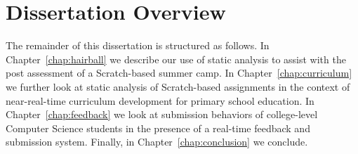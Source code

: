 \section{Dissertation Overview}
The remainder of this dissertation is structured as follows. In
Chapter~\ref{chap:hairball} we describe our use of static analysis to assist
with the post assessment of a Scratch-based summer camp. In
Chapter~\ref{chap:curriculum} we further look at static analysis of
Scratch-based assignments in the context of near-real-time curriculum
development for primary school education. In Chapter~\ref{chap:feedback} we
look at submission behaviors of college-level Computer Science students in the
presence of a real-time feedback and submission system. Finally, in
Chapter~\ref{chap:conclusion} we conclude.
